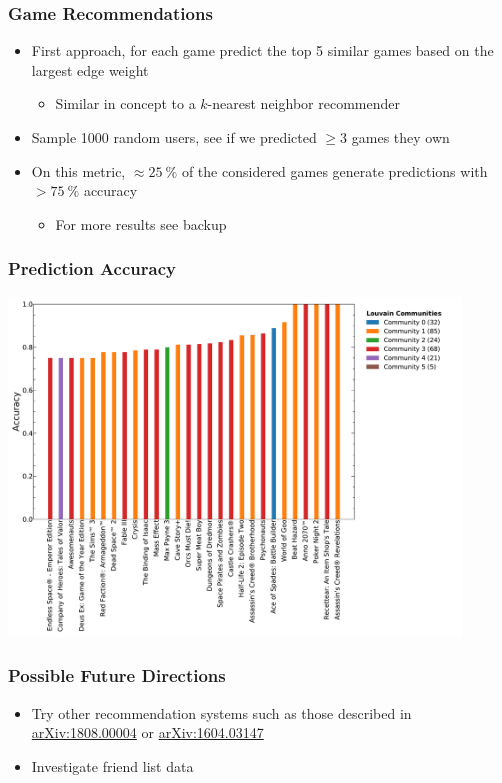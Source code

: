 \documentclass[18pt,xcolor=table]{beamer} \usefonttheme[onlymath]{serif}
\begin{document}
\begin{frame}
  \frametitle{Game Recommendations}
  \begin{itemize}
    \item First approach, for each game predict the top 5 similar games based on the largest edge weight
    \begin{itemize}
      \item Similar in concept to a $k$-nearest neighbor recommender
    \end{itemize}
    \vspace{0.2cm}
    \item Sample \num{1000} random users, see if we predicted $\geq 3$ games they own
    \vspace{0.2cm}
    \item On this metric, $\approx \SI{25}{\percent}$ of the considered games generate predictions with $> \SI{75}{\percent}$ accuracy
    \begin{itemize}
      \item For more results see backup
    \end{itemize}
  \end{itemize}
\end{frame}

\begin{frame}
  \frametitle{Prediction Accuracy}
  \centering
  \includegraphics[width=0.9\textwidth]{../output/prediction_acc_high.pdf}
\end{frame}

\begin{frame}
  \frametitle{Possible Future Directions}
  \begin{itemize}
    \item Try other recommendation systems such as those described in\\\href{http://arxiv.org/abs/1808.00004}{arXiv:1808.00004} or \href{http://arxiv.org/abs/1604.03147}{arXiv:1604.03147}
    \vspace{0.2cm}
    \item Investigate friend list data
  \end{itemize}
\end{frame}
\end{document}
